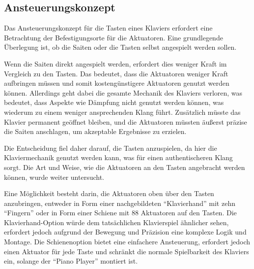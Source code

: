 \subsection{Ansteuerungskonzept} \label{konzeptionHW-ansteuerungskonzept}
Das Ansteuerungskonzept für die Tasten eines Klaviers erfordert eine Betrachtung der Befestigungsorte für
die Aktuatoren. Eine grundlegende Überlegung ist, ob die Saiten oder die Tasten selbst angespielt werden sollen.

Wenn die Saiten direkt angespielt werden, erfordert dies weniger Kraft im Vergleich zu den Tasten.
Das bedeutet, dass die Aktuatoren weniger Kraft aufbringen müssen und somit kostengünstigere
Aktuatoren genutzt werden können. Allerdings geht
dabei die gesamte Mechanik des Klaviers verloren, was bedeutet, dass Aspekte wie Dämpfung nicht genutzt werden können,
was wiederum zu einem weniger ansprechenden Klang führt. Zusätzlich müsste das Klavier permanent geöffnet bleiben, und die
Aktuatoren müssten äußerst präzise die Saiten anschlagen, um akzeptable Ergebnisse zu erzielen.

Die Entscheidung fiel daher darauf, die Tasten anzuspielen, da hier die Klaviermechanik genutzt werden kann, was für einen
authentischeren Klang sorgt. Die Art und Weise, wie die Aktuatoren an den Tasten angebracht werden können, wurde
weiter untersucht.

Eine Möglichkeit besteht darin, die Aktuatoren oben über den Tasten anzubringen, entweder in Form einer nachgebildeten
``Klavierhand'' mit zehn ``Fingern'' oder in Form einer Schiene mit 88 Aktuatoren auf den Tasten. Die Klavierhand-Option würde
dem tatsächlichen Klavierspiel ähnlicher sehen, erfordert jedoch aufgrund der Bewegung und Präzision eine komplexe Logik und
Montage. Die Schienenoption bietet eine einfachere Ansteuerung, erfordert jedoch einen Aktuator für jede Taste und schränkt die
normale Spielbarkeit des Klaviers ein, solange der ``Piano Player'' montiert ist.

